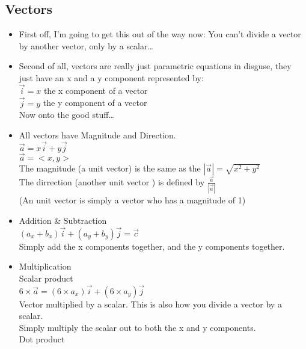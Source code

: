 \documentclass{article}
\begin{document}
  \subsection*{\color{BrickRed}Vectors}
  \begin{itemize}
    \item First off, I'm going to get this out of the way now: You can't divide a
      vector by another vector, only by a scalar\ldots\\
    \item Second of all, vectors are really just parametric equations in
      disguse, they just have an x and a y component represented
      by:\\
    \subitem $\vec{i}=x$ the x component of a vector\\
    \subitem $\vec{j}=y$ the y component of a vector\\
    \subitem Now onto the good stuff\ldots
    \item All vectors have Magnitude and Direction.\\
      \subitem $ \vec{a}=x\vec{i}+y\vec{j} $\\
      \subitem $ \vec{a}=<x,y>$\\
        \subsubitem The magnitude (a unit vector) is the same as the $|\vec{a}|=\sqrt{x^{2}+y^{2}}$\\
	\subsubitem The dirrection (another unit vector ) is defined by $\frac{\vec{a}}{|\vec{a}|}$\\
	\subsubitem (An unit vector is simply a vector who has a 
	magnitude of 1)\\
    \item Addition \& Subtraction\\
      \subitem $(a_x+b_x)\vec{i}+(a_y+b_y)\vec{j}=\vec{c}$\\
      \subitem Simply add the x components together, and the y
      components together.\\ 
    \item Multiplication\\
      \subitem Scalar product\\
      	\subsubitem $6 \times \vec{a}=(6\times
	a_x)\vec{i}+(6\times a_y)\vec{j}$\\
        \subsubitem Vector multiplied by a scalar. This is also how you divide a vector by a
	scalar.\\
        \subsubitem Simply multiply the scalar out to both the x
	and y components.\\
      \subitem Dot product\\

\end{itemize}
\end{document}
